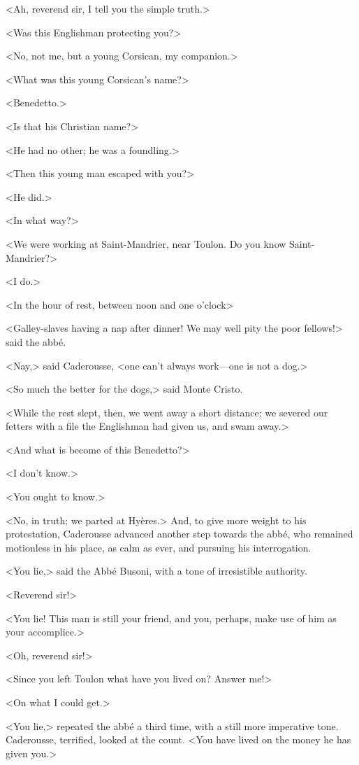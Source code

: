  <Ah, reverend sir, I tell you the simple truth.> 

 <Was this Englishman protecting you?> 

 <No, not me, but a young Corsican, my companion.> 

 <What was this young Corsican's name?> 

 <Benedetto.> 

 <Is that his Christian name?> 

 <He had no other; he was a foundling.> 

 <Then this young man escaped with you?> 

 <He did.> 

 <In what way?> 

 <We were working at Saint-Mandrier, near Toulon. Do you know Saint-Mandrier?> 

 <I do.> 

 <In the hour of rest, between noon and one o'clock\longdash> 

 <Galley-slaves having a nap after dinner! We may well pity the poor fellows!> said the abbé. 

 <Nay,> said Caderousse, <one can't always work—one is not a dog.> 

 <So much the better for the dogs,> said Monte Cristo. 

 <While the rest slept, then, we went away a short distance; we severed our fetters with a file the Englishman had given us, and swam away.> 

 <And what is become of this Benedetto?> 

 <I don't know.> 

 <You ought to know.> 

 <No, in truth; we parted at Hyères.> And, to give more weight to his protestation, Caderousse advanced another step towards the abbé, who remained motionless in his place, as calm as ever, and pursuing his interrogation. 

 <You lie,> said the Abbé Busoni, with a tone of irresistible authority. 

 <Reverend sir!> 

 <You lie! This man is still your friend, and you, perhaps, make use of him as your accomplice.>

<Oh, reverend sir!> 

 <Since you left Toulon what have you lived on? Answer me!> 

 <On what I could get.> 

 <You lie,> repeated the abbé a third time, with a still more imperative tone. Caderousse, terrified, looked at the count. <You have lived on the money he has given you.> 

